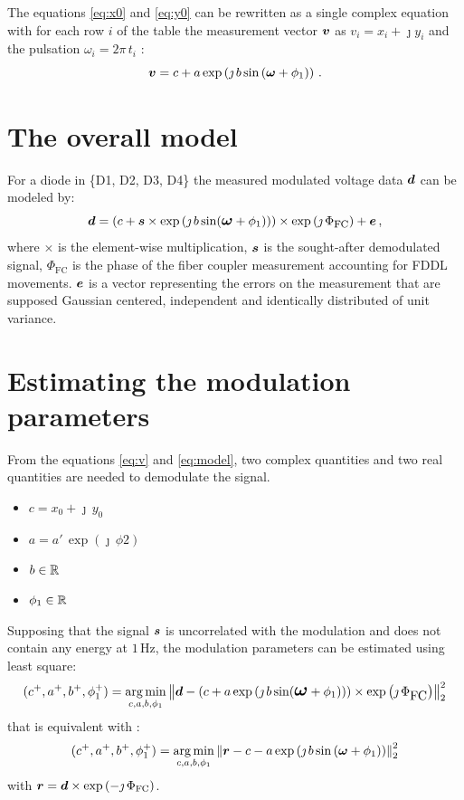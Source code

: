\documentclass[a4paper,11pt,twoside]{scrartcl}
\begin{document}
The equations \ref{eq:x0} and \ref{eq:y0} can be rewritten as a single complex equation with  for each row $i$ of the table the measurement vector $\boldsymbol{v}$  as $v_i= x_i + \jmath y_i$  and the pulsation $\omega_i = 2\pi\,t_i$ :
\begin{equation}
    \boldsymbol{v} = c + a \exp\left( \jmath \, b \sin\left( \boldsymbol{\omega} + \phi_1\right)\right)\,.\label{eq:v}
\end{equation}

\section{The overall model}
For a  diode in \{D1, D2, D3, D4\} the measured modulated voltage data $\boldsymbol{d}$ can be modeled by:
\begin{equation}
    \boldsymbol{d} = \left( c + \boldsymbol{s} \times  \exp\left( \jmath \, b \sin\large( \boldsymbol{\omega} + \phi_1\large)\right)\right)\times\exp\left(\jmath\,\Phi_\textrm{FC}\right)+  \boldsymbol{e}\,,\label{eq:model}
\end{equation}
where $\times$ is the element-wise multiplication, $\boldsymbol{s}$ is the sought-after demodulated signal, $\Phi_\textrm{FC}$ is the phase of the fiber coupler measurement accounting for FDDL movements. $\boldsymbol{e}$ is a vector representing the errors on the measurement that are supposed Gaussian centered, independent and identically distributed of unit variance.

\section{ Estimating the modulation parameters}

From the equations \ref{eq:v} and  \ref{eq:model}, two complex quantities and two real quantities are needed to demodulate the signal.
\begin{itemize}
    \item $c = x_0 + \jmath\,y_0$
    \item $a = a' \,\exp\left( \jmath\,\phi2\right)$
    \item $b \in \mathbb{R}$ 
    \item $\phi_1 \in \mathbb{R}$
\end{itemize}
Supposing that the signal $\boldsymbol{s}$ is uncorrelated with the modulation and does not contain any energy at $1\,$Hz, the modulation parameters can be estimated using least square:
\begin{equation}
    (c^+, a^+, b^+, \phi_1^+) = \argmin_{c,a,b,\phi_1} \Norm{\V{d} -  \left(c + a \exp\left( \jmath \, b \sin\Large( \V{\omega} + \phi_1\right)\Large)\right)\times\exp\left(\jmath\,\Phi_\textrm{FC}\right) }_2^2
\end{equation}
that is equivalent with : 
\begin{equation}
    (c^+, a^+, b^+, \phi_1^+) = \argmin_{c,a,b,\phi_1} \Norm{\V{r} -  c - a \exp\left( \jmath \, b \sin\left( \V{\omega} + \phi_1\right)\right) }_2^2\label{eq:r}
\end{equation}
with $\boldsymbol{r} =\boldsymbol{d}\times\exp\left(-\jmath\,\Phi_\textrm{FC}\right)$.
\end{document}
